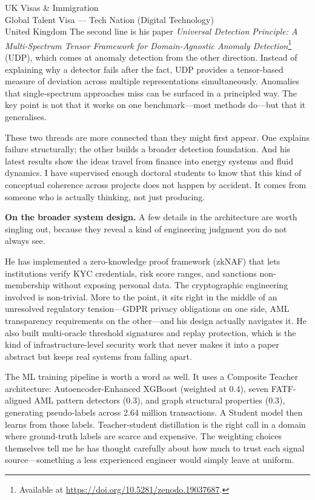 \documentclass[12pt,a4paper]{letter}
\begin{document}
\begin{letter}{UK Visas \& Immigration\\
Global Talent Visa --- Tech Nation (Digital Technology)\\
United Kingdom}
The second line is his paper \textit{Universal Detection Principle: A Multi-Spectrum Tensor Framework for Domain-Agnostic Anomaly Detection}\footnote{Available at \url{https://doi.org/10.5281/zenodo.19037687}.} (UDP), which comes at anomaly detection from the other direction. Instead of explaining why a detector fails after the fact, UDP provides a tensor-based measure of deviation across multiple representations simultaneously. Anomalies that single-spectrum approaches miss can be surfaced in a principled way. The key point is not that it works on one benchmark---most methods do---but that it generalises.

These two threads are more connected than they might first appear. One explains failure structurally; the other builds a broader detection foundation. And his latest results show the ideas travel from finance into energy systems and fluid dynamics. I have supervised enough doctoral students to know that this kind of conceptual coherence across projects does not happen by accident. It comes from someone who is actually thinking, not just producing.

\textbf{On the broader system design.} A few details in the architecture are worth singling out, because they reveal a kind of engineering judgment you do not always see.

He has implemented a zero-knowledge proof framework (zkNAF) that lets institutions verify KYC credentials, risk score ranges, and sanctions non-membership without exposing personal data. The cryptographic engineering involved is non-trivial. More to the point, it sits right in the middle of an unresolved regulatory tension---GDPR privacy obligations on one side, AML transparency requirements on the other---and his design actually navigates it. He also built multi-oracle threshold signatures and replay protection, which is the kind of infrastructure-level security work that never makes it into a paper abstract but keeps real systems from falling apart.

The ML training pipeline is worth a word as well. It uses a Composite Teacher architecture: Autoencoder-Enhanced XGBoost (weighted at 0.4), seven FATF-aligned AML pattern detectors (0.3), and graph structural properties (0.3), generating pseudo-labels across 2.64 million transactions. A Student model then learns from those labels. Teacher-student distillation is the right call in a domain where ground-truth labels are scarce and expensive. The weighting choices themselves tell me he has thought carefully about how much to trust each signal source---something a less experienced engineer would simply leave at uniform.


\end{letter}
\end{document}
